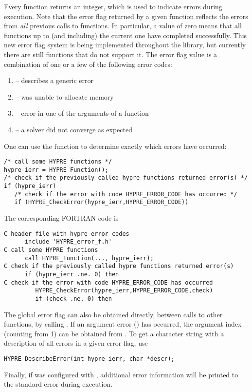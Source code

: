 Every \hypre{} function returns an integer, which is used to indicate errors
during execution.  Note that the error flag returned by a given function
reflects the errors from {\em all} previous calls to \hypre{} functions.  In
particular, a value of zero means that all \hypre{} functions up to (and
including) the current one have completed successfully.  This new error flag
system is being implemented throughout the library, but currently there are
still functions that do not support it.  The error flag value is a combination
of one or a few of the following error codes:
\begin{enumerate}
\item {} -- describes a generic error
\item {} -- \hypre{} was unable to allocate memory
\item {} -- error in one of the arguments of a \hypre{} function
\item {} -- a \hypre{} solver did not converge as expected
\end{enumerate}
One can use the  function to determine exactly which
errors have occurred:
\begin{display} \begin{verbatim}
/* call some HYPRE functions */
hypre_ierr = HYPRE_Function();
/* check if the previously called hypre functions returned error(s) */
if (hypre_ierr)
   /* check if the error with code HYPRE_ERROR_CODE has occurred */
   if (HYPRE_CheckError(hypre_ierr,HYPRE_ERROR_CODE))
\end{verbatim} \end{display}
The corresponding FORTRAN code is
\begin{display} \begin{verbatim}
C header file with hypre error codes
      include 'HYPRE_error_f.h'
C call some HYPRE functions
      call HYPRE_Function(..., hypre_ierr);
C check if the previously called hypre functions returned error(s)
      if (hypre_ierr .ne. 0) then
C check if the error with code HYPRE_ERROR_CODE has occurred
         HYPRE_CheckError(hypre_ierr,HYPRE_ERROR_CODE,check)
         if (check .ne. 0) then
\end{verbatim} \end{display}
The global error flag can also be obtained directly, between calls to other
\hypre{} functions, by calling .  If an argument error
() has occurred, the argument index (counting from 1)
can be obtained from .  To get a character string
with a description of all errors in a given error flag, use
\begin{display} \begin{verbatim}
HYPRE_DescribeError(int hypre_ierr, char *descr);
\end{verbatim} \end{display}
Finally, if \hypre{} was configured with , additional
error information will be printed to the standard error during execution.


